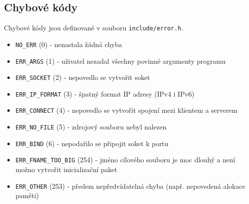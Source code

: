 \documentclass[a4paper,11pt]{article}
\begin{document}
    \subsection{Chybové kódy}
    Chybové kódy jsou definované v souboru \verb|include/error.h|.
    \begin{itemize}
        \setlength\itemsep{1pt}
        \item \verb|NO_ERR|            (0) \-- nenastala žádná chyba
        \item \verb|ERR_ARGS|          (1) \-- uživatel nezadal všechny povinné argumenty programu
        \item \verb|ERR_SOCKET|        (2) \-- nepovedlo se vytvořit soket
        \item \verb|ERR_IP_FORMAT|     (3) \-- špatný format IP adresy (IPv4 i IPv6)
        \item \verb|ERR_CONNECT|       (4) \-- nepovedlo se vytvořit spojení mezi klientem a serverem
        \item \verb|ERR_NO_FILE|       (5) \-- zdrojový souboru nebyl nalezen
        \item \verb|ERR_BIND|          (6) \-- nepodařilo se připojit soket k portu
        \item \verb|ERR_FNAME_TOO_BIG| (254) \-- jméno cílového souboru je moc dlouhý a není možno vytvořit inicializační paket
    \item \verb|ERR_OTHER|         (253) \-- předem nepředvídatelná chyba (např. nepovedená alokace paměti)
    \end{itemize}
\end{document}
